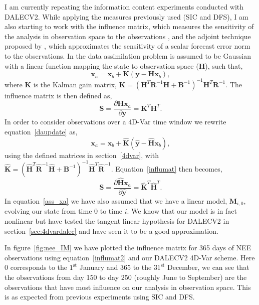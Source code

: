 \documentclass[11pt]{article}
\begin{document}
I am currently repeating the information content experiments conducted with DALECV2. While applying the measures previously used (SIC and DFS), I am also starting to work with the influence matrix, which measures the sensitivity of the analysis in observation space to the observations \citep{Cardinali2004}, and the adjoint technique proposed by \cite{Langland2004}, which approximates the sensitivity of a scalar forecast error norm to the observations. In \cite{Cardinali2004} the data assimilation problem is assumed to be Gaussian with a linear function mapping the state to observation space (\textbf{H}), such that,
\begin{equation}
\textbf{x}_{a} = \textbf{x}_{b} + \textbf{K}(\textbf{y} - \textbf{H}\textbf{x}_{b}), \label{daupdate}
\end{equation}
where \textbf{K} is the Kalman gain matrix, $\textbf{K} = (\textbf{H}^{T}\textbf{R}^{-1}\textbf{H} + \textbf{B}^{-1})^{-1}\textbf{H}^{T}\textbf{R}^{-1}$. The influence matrix is then defined as,
\begin{equation}
\textbf{S} = \frac{\partial {\mathbf{H}}\textbf{x}_a}{\partial {\textbf{y}}} = \textbf{K}^{T}\textbf{H}^{T}. \label{influmat}
\end{equation}
In order to consider observations over a 4D-Var time window we rewrite equation~\ref{daupdate} as,
\begin{equation}
\textbf{x}_{a} = \textbf{x}_{b} + \hat{\textbf{K}}(\hat{\textbf{y}} - \hat{\textbf{H}}\textbf{x}_{b}), \label{ass_xa}
\end{equation}
using the defined matrices in section~\ref{4dvar}, with $\hat{\textbf{K}} = (\hat{\textbf{H}}^{T}\hat{\textbf{R}}^{-1}\hat{\textbf{H}} + \textbf{B}^{-1})^{-1}\hat{\textbf{H}}^{T}\hat{\textbf{R}}^{-1}$. Equation~\ref{influmat} then becomes,
\begin{equation}
\textbf{S} = \frac{\partial {\hat{\mathbf{H}}}\textbf{x}_a}{\partial \hat{{\textbf{y}}}} = \hat{\textbf{K}}^{T}\hat{\textbf{H}}^{T}. \label{influmat2}
\end{equation}
In equation~\ref{ass_xa} we have also assumed that we have a linear model, $\mathbf{M}_{i,0}$, evolving our state from time 0 to time $i$. We know that our model is in fact nonlinear but have tested the tangent linear hypothesis for DALECV2 in section~\ref{sec:4dvardalec} and have seen it to be a good approximation. 

In figure~\ref{fig:nee_IM} we have plotted the influence matrix for 365 days of NEE observations using equation~\ref{influmat2} and our DALECV2 4D-Var scheme. Here 0 corresponds to the $1^{\text{st}}$ January and 365 to the $31^{\text{st}}$ December, we can see that the observations from day 150 to day 250 (roughly June to September) are the observations that have most influence on our analysis in observation space. This is as expected from previous experiments using SIC and DFS. 
\end{document}

